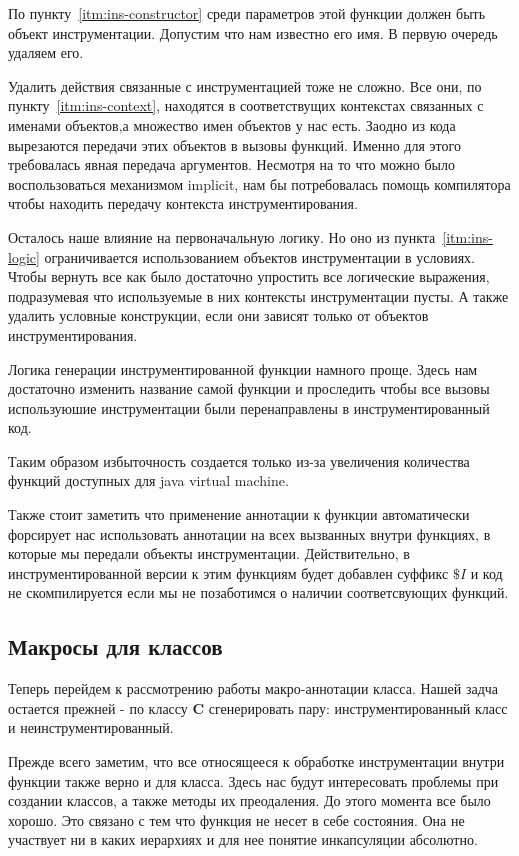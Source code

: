 По пункту~\ref{itm:ins-constructor} среди параметров этой функции должен быть
объект инструментации.
Допустим что нам известно его имя.
В первую очередь удаляем его.

Удалить действия связанные с инструментацией тоже не сложно.
Все они, по пункту~\ref{itm:ins-context}, находятся в соответствущих контекстах
связанных с именами объектов,а множество имен объектов у нас есть.
Заодно из кода вырезаются передачи этих объектов в вызовы функций.
Именно для этого требовалась явная передача аргументов.
Несмотря на то что можно было воспользоваться механизмом implicit,
нам бы потребовалась помощь компилятора чтобы находить передачу контекста
инструментирования.

Осталось наше влияние на первоначальную логику.
Но оно из пункта~\ref{itm:ins-logic} ограничивается использованием объектов
инструментации в условиях.
Чтобы вернуть все как было достаточно упростить все логические выражения,
подразумевая что используемые в них контексты инструментации пусты.
А также удалить условные конструкции, если они зависят только от объектов
инструментирования.

Логика генерации инструментированной функции намного проще.
Здесь нам достаточно изменить название самой функции и проследить чтобы все
вызовы используюшие инструментации были перенаправлены в инструментированный
код.

Таким образом избыточность создается только из-за увеличения количества функций
доступных для java virtual machine.

Также стоит заметить что применение аннотации к функции автоматически форсирует
нас использовать аннотации на всех вызванных внутри функциях, в которые мы передали
объекты инструментации.
Действительно, в инструментированной версии к этим функциям будет добавлен
суффикс $\$I$ и код не скомпилируется если мы не позаботимся о наличии
соответсвующих функций.

\subsection{Макросы для классов}
\label{sec:macroClass}
Теперь перейдем к рассмотрению работы макро-аннотации класса.
Нашей задча остается прежней - по классу \textbf{C} сгенерировать пару:
инструментированный класс и неинструментированный.

Прежде всего заметим, что все относящееся к обработке инструментации внутри
функции также верно и для класса.
Здесь нас будут интересовать проблемы при создании классов, а также методы
их преодаления.
До этого момента все было хорошо.
Это связано с тем что функция не несет в себе состояния.
Она не участвует ни в каких иерархиях и для нее понятие инкапсуляции абсолютно.

